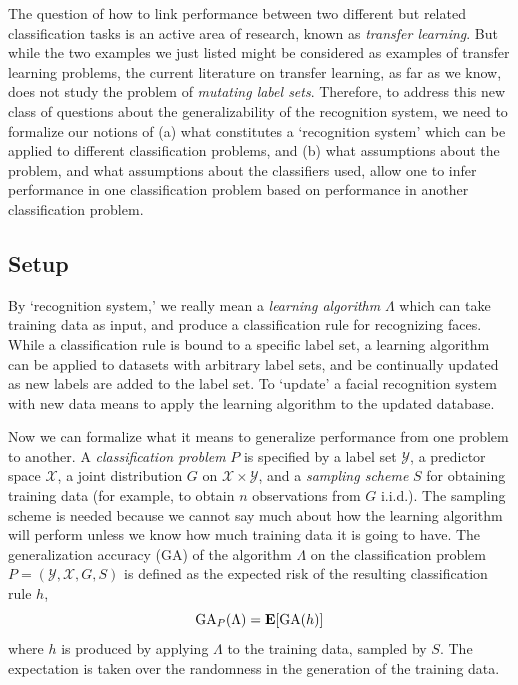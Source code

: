\documentclass[12pt]{article}
\begin{document}
The question of how to link performance between two different but
related classification tasks is an active area of research, known as
\emph{transfer learning}.  But while the two examples we just listed
might be considered as examples of transfer learning problems, the
current literature on transfer learning, as far as we know, does not
study the problem of \emph{mutating label sets}.  Therefore, to
address this new class of questions about the generalizability of the
recognition system, we need to formalize our notions of (a) what
constitutes a `recognition system' which can be applied to different
classification problems, and (b) what assumptions about the problem,
and what assumptions about the classifiers used, allow one to infer
performance in one classification problem based on performance in
another classification problem.

\subsection{Setup}
By `recognition system,' we really mean a \emph{learning algorithm}
$\Lambda$ which can take training data as input, and produce a
classification rule for recognizing faces.  While a classification
rule is bound to a specific label set, a learning algorithm can be
applied to datasets with arbitrary label sets, and be continually
updated as new labels are added to the label set.  To `update' a
facial recognition system with new data means to apply the learning
algorithm to the updated database.

Now we can formalize what it means to generalize performance from one
problem to another.  A \emph{classification problem} $P$ is specified
by a label set $\mathcal{Y}$, a predictor space $\mathcal{X}$, a joint
distribution $G$ on $\mathcal{X} \times \mathcal{Y}$, and a
\emph{sampling scheme} $S$ for obtaining training data (for example,
to obtain $n$ observations from $G$ i.i.d.).  The sampling scheme is
needed because we cannot say much about how the learning algorithm
will perform unless we know how much training data it is going to
have.  The generalization accuracy (GA) of the algorithm $\Lambda$ on the
classification problem $P = (\mathcal{Y}, \mathcal{X}, G, S)$ is
defined as the expected risk of the resulting classification rule $h$,
\[
\text{GA}_P(\Lambda) = \textbf{E}[\text{GA}(h)]
\]
where $h$ is produced by applying $\Lambda$ to the training data,
sampled by $S$.  The expectation is taken over the randomness in the
generation of the training data.
\end{document}
